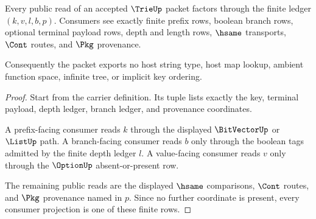 \begin{theorem}\label{thm:trie-ledger-coverage}
Every public read of an accepted $\TrieUp$ packet factors through the finite
ledger $(k,v,l,b,p)$. Consumers see exactly finite prefix rows, boolean branch
rows, optional terminal payload rows, depth and length rows, $\hsame$
transports, $\Cont$ routes, and $\Pkg$ provenance.

Consequently the packet exports no host string type, host map lookup, ambient
function space, infinite tree, or implicit key ordering.
\end{theorem}
\begin{proof}
Start from the carrier definition. Its tuple lists exactly the key, terminal
payload, depth ledger, branch ledger, and provenance coordinates.

A prefix-facing consumer reads $k$ through the displayed $\BitVectorUp$ or
$\ListUp$ path. A branch-facing consumer reads $b$ only through the boolean
tags admitted by the finite depth ledger $l$. A value-facing consumer reads
$v$ only through the $\OptionUp$ absent-or-present row.

The remaining public reads are the displayed $\hsame$ comparisons, $\Cont$
routes, and $\Pkg$ provenance named in $p$. Since no further coordinate is
present, every consumer projection is one of these finite rows.
\end{proof}

